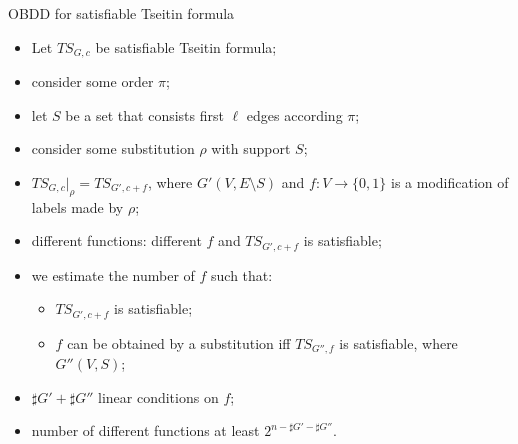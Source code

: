\begin{frame}{OBDD for satisfiable Tseitin formula}

    \begin{itemize}
        \item Let $TS_{G, c}$ be satisfiable Tseitin formula;
        \item consider some order $\pi$;
        \item let $S$ be a set that consists first $\ell$ edges according $\pi$;
        \item consider some substitution $\rho$ with support $S$;
        \item $TS_{G, c}|_\rho = TS_{G', c + f}$, where $G'(V, E \setminus S)$ and $f: V \to \{0, 1\}$ is
            a modification of labels made by $\rho$;
        \item different functions: different $f$ and $TS_{G', c + f}$ is satisfiable;
        \item we estimate the number of $f$ such that:
            \begin{itemize}
                \item $TS_{G', c + f}$ is satisfiable;
                \item $f$ can be obtained by a substitution iff $TS_{G'', f}$ is satisfiable, where
                    $G''(V, S)$;
            \end{itemize}
        \item $\sharp G' + \sharp G''$ linear conditions on $f$;
        \item number of different functions at least $2^{n - \sharp G' - \sharp G''}$.
    \end{itemize}
    
\end{frame}



